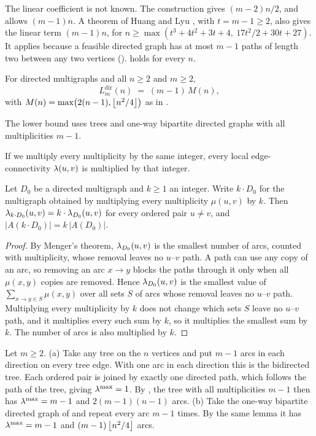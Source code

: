 The linear coefficient is not known.
The construction gives $(m-2)n/2$, and  allows $(m-1)n$.
A theorem of Huang and Lyu \cite[Theorem~2]{HuangLyu26}, with $t=m-1\ge2$, also gives the linear term $(m-1)n$, for $n\ge\max(t^3+4t^2+3t+4,\ 17t^2/2+30t+27)$.
It applies because a feasible directed graph has at most $m-1$ paths of length two between any two vertices ().
 holds for every $n$.

\begin{theorem}\label{thm:dir-multi-full}
For directed multigraphs and all $n \ge 2$ and $m \ge 2$,
\[
    L_m^{\mathrm{dir}}(n) \;=\; (m-1)\,M(n),
\]
with $M(n)=\max\bigl(2(n-1),\left\lfloor n^2/4 \right\rfloor\bigr)$ as in .
\end{theorem}

The lower bound uses trees and one-way bipartite directed graphs with all multiplicities $m-1$.



If we multiply every multiplicity by the same integer, every local edge-connectivity $\lambda(u,v)$ is multiplied by that integer.

\begin{lemma}\label{lem:thickening}
Let $D_0$ be a directed multigraph and $k \ge 1$ an integer. Write $k \cdot D_0$ for the multigraph obtained by multiplying every multiplicity $\mu(u,v)$ by $k$. Then $\lambda_{k \cdot D_0}(u,v) = k \cdot \lambda_{D_0}(u,v)$ for every ordered pair $u \ne v$, and $|A(k \cdot D_0)| = k\,|A(D_0)|$.
\end{lemma}

\begin{proof}
By Menger's theorem, $\lambda_{D_0}(u,v)$ is the smallest number of arcs, counted with multiplicity, whose removal leaves no $u$--$v$ path.
A path can use any copy of an arc, so removing an arc $x\to y$ blocks the paths through it only when all $\mu(x,y)$ copies are removed.
Hence $\lambda_{D_0}(u,v)$ is the smallest value of $\sum_{x\to y\in S}\mu(x,y)$ over all sets $S$ of arcs whose removal leaves no $u$--$v$ path.
Multiplying every multiplicity by $k$ does not change which sets $S$ leave no $u$--$v$ path, and it multiplies every such sum by $k$, so it multiplies the smallest sum by $k$.
The number of arcs is also multiplied by $k$.
\end{proof}

\begin{construction}\label{const:dir-multi-lower}
Let $m \ge 2$.
(a) Take any tree on the $n$ vertices and put $m-1$ arcs in each direction on every tree edge.
With one arc in each direction this is the bidirected tree. Each ordered pair is joined by exactly one directed path, which follows the path of the tree, giving $\lambda^{\max} = 1$.
By , the tree with all multiplicities $m-1$ then has $\lambda^{\max} = m-1$ and $2(m-1)(n-1)$ arcs.
(b) Take the one-way bipartite directed graph of  and repeat every arc $m-1$ times.
By the same lemma it has $\lambda^{\max} = m-1$ and $(m-1)\left\lfloor n^2/4 \right\rfloor$ arcs.
\end{construction}

